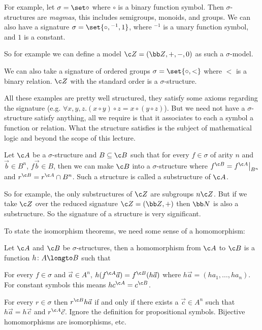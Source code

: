 \edefn

For example, let $\sigma=\set\circ$ where $\circ$ is a binary function symbol.
Then $\sigma$-structures are {\it magmas}, this includes semigroups, monoids, and groups.
We can also have a signature $\sigma=\set{\circ,{}^{-1},1}$, where ${}^{-1}$ is a unary function symbol, and $1$ is a constant.

So for example we can define a model $\c Z=({\bb Z},+,-,0)$ as such a $\sigma$-model.

We can also take a signature of ordered groups $\sigma=\set{\circ,<}$ where $<$ is a binary relation.
$\c Z$ with the standard order is a $\sigma$-structure.

All these examples are pretty well structured, they satisfy some axioms regarding the signature (e.g. $\forall x,y,z. (x\circ y)\circ z=x\circ(y\circ z)$).
But we need not have a $\sigma$-structure satisfy anything, all we require is that it associates to each a symbol a function or relation.
What the structure satisfies is the subject of mathematical logic and beyond the scope of this lecture.

\bdefn

    Let $\c A$ be a $\sigma$-structure and $B\subseteq\c B$ such that for every $f\in\sigma$ of arity $n$ and $\vec b\in B^n$, $f\vec b\in B$, then we can make $\c B$ into a $\sigma$-structure where
    $f^{\c B}=f^{\c A}\bigl|_{B^n}$ and $r^{\c B}=r^{\c A}\cap B^n$.
    Such a structure is called a {\emphcolor substructure} of $\c A$.

\edefn

So for example, the only substructures of $\c Z$ are subgroups $n\c Z$.
But if we take $\c Z$ over the reduced signature $\c Z=({\bb Z},+)$ then ${\bb N}$ is also a substructure.
So the signature of a structure is very significant.

To state the isomorphism theorems, we need some sense of a homomorphism:

\bdefn

    Let $\c A$ and $\c B$ be $\sigma$-structures, then a {\emphcolor homomorphism} from $\c A$ to $\c B$ is a function $h\colon A\longto B$ such that
    \benum
        \item For every $f\in\sigma$ and $\vec a\in A^n$, $h(f^{\c A}\vec a)=f^{\c B}(h\vec a)$ where $h\vec a=(ha_1,\dots,ha_n)$.
        For constant symbols this means $hc^{\c A}=c^{\c B}$.
        \item For every $r\in\sigma$ then $r^{\c B}h\vec a$ if and only if there exists a $\vec c\in A^n$ such that $h\vec a=h\vec c$ and $r^{\c A}\vec c$.
        Ignore the definition for propositional symbols.
    \eenum
    Bijective homomorphisms are isomorphisms, etc.

